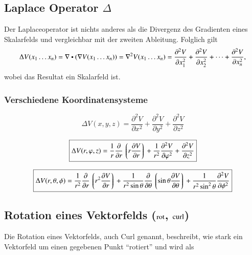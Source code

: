 \subsection[Laplace Operator Delta]{Laplace Operator $\Delta$}
Der Laplaceoperator ist nichts anderes als die Divergenz des Gradienten eines Skalarfelds und vergleichbar mit der zweiten Ableitung.
Folglich gilt
\[
    \Delta V(x_1 \dots x_n) 
    = \nabla \dotp (\nabla V(x_1 \dots x_n)) 
    = \nabla^2 V(x_1 \dots x_n) 
    = \frac{\partial^2 V}{\partial x_1^2} + \frac{\partial^2 V}{\partial x_2^2} + \dots + \frac{\partial^2 V}{\partial x_n^2},
\]
wobei das Resultat ein Skalarfeld ist.

\subsubsection{Verschiedene Koordinatensysteme}
\[
    \boxed{
        \Delta V(x, y, z)
        = \frac{\partial^2 V}{\partial x^2} 
        + \frac{\partial^2 V}{\partial y^2} 
        + \frac{\partial^2 V}{\partial z^2}
    }
\]

\[
    \boxed{
        \Delta V(r, \varphi, z) 
        = \frac{1}{r}\frac{\partial}{\partial r}\left\lgroup r\frac{\partial V}{\partial r} \right\rgroup 
        + \frac{1}{r^2}\frac{\partial^2 V}{\partial \varphi^2} 
        + \frac{\partial^2 V}{\partial z^2}
    }
\]

\[
    \boxed{
        \Delta V(r, \theta, \phi)=
        \frac{1}{r^2}\frac{\partial}{\partial r}\left\lgroup r^2 \frac{\partial V}{\partial r} \right\rgroup 
        + \frac{1}{r^2\sin\theta}\frac{\partial}{\partial\theta}\left\lgroup \sin\theta \frac{\partial V}{\partial\theta} \right\rgroup 
        + \frac{1}{r^2\sin^2\theta}\frac{\partial^2 V}{\partial\phi^2}
 }
\]


\subsection[Rotation eines Vektorfelds (rot, curl)]{Rotation eines Vektorfelds ($\operatorname{rot}$, $\operatorname{curl}$)}
Die Rotation eines Vektorfelds, auch Curl genannt, beschreibt, wie stark ein Vektorfeld um einen gegebenen Punkt ``rotiert'' und wird als

